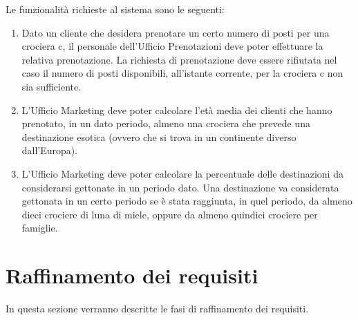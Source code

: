 \documentclass{article}
\begin{document}
Le funzionalità richieste al sistema sono le seguenti:

\begin{enumerate}
    \item Dato un cliente che desidera prenotare un certo numero di posti per una crociera c, il personale dell'Ufficio Prenotazioni deve poter effettuare la relativa prenotazione. La richiesta di prenotazione deve essere rifiutata nel caso il numero di posti disponibili, all'istante corrente, per la crociera c non sia sufficiente.
    \item L'Ufficio Marketing deve poter calcolare l'età media dei clienti che hanno prenotato, in un dato periodo, almeno una crociera che prevede una destinazione esotica (ovvero che si trova in un continente diverso dall'Europa).
    \item L'Ufficio Marketing deve poter calcolare la percentuale delle destinazioni da considerarsi gettonate in un periodo dato. Una destinazione va considerata gettonata in un certo periodo se è stata raggiunta, in quel periodo, da almeno dieci crociere di luna di miele, oppure da almeno quindici crociere per famiglie.
\end{enumerate}

\newpage
\section{Raffinamento dei requisiti}

In questa sezione verranno descritte le fasi di raffinamento dei requisiti.
\end{document}

